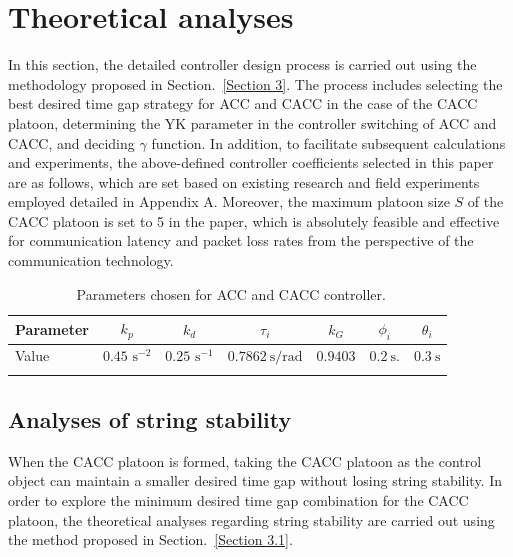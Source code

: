 \documentclass[trsc,nonblindrev]{informs3} %
\begin{document}
\section{Theoretical analyses}
\label{Section 4}
In this section, the detailed controller design process is carried out using the methodology proposed in Section.~\ref{Section 3}. The process includes selecting the best desired time gap strategy for ACC and CACC in the case of the CACC platoon, determining the YK parameter in the controller switching of ACC and CACC, and deciding $\gamma$ function. In addition, to facilitate subsequent calculations and experiments, the above-defined controller coefficients selected in this paper are as follows, which are set based on existing research \citep{milanes2014modeling,milanes2013cooperative,navas2016using} and field experiments employed detailed in Appendix A. Moreover, the maximum platoon size $S$ of the CACC platoon is set to 5 in the paper, which is absolutely feasible and effective for communication latency and packet loss rates from the perspective of the communication technology.
\begin{table}
    \centering

    \caption{~Parameters chosen for ACC and CACC controller.}
    \resizebox{.95\columnwidth}{!}
    {\begin{tabular}{lcccccc} \toprule
            Parameter & $k_{p}$ & $k_{d}$ & $\tau_{i}$ & $k_{G}$ & $\phi_{i}$ & $\theta_{i}$ \\ \midrule Value & $0.45$ $ \mathrm{s}^{-2}$ & $0.25 $ $ \mathrm{s}^{-1}$ & $0.7862 \mathrm{~s} / \mathrm{rad}$ & $0.9403$ & $0.2 \mathrm{~s}.$ & $0.3 \mathrm{~s}$ \\ \bottomrule
            \label{table1}
        \end{tabular}}

\end{table}

\subsection{Analyses of string stability}
\label{Section 4.1}

When the CACC platoon is formed, taking the CACC platoon as the control object can maintain a smaller desired time gap without losing string stability. In order to explore the minimum desired time gap combination for the CACC platoon, the theoretical analyses regarding string stability are carried out using the method proposed in Section.~\ref{Section 3.1}.
\end{document}
